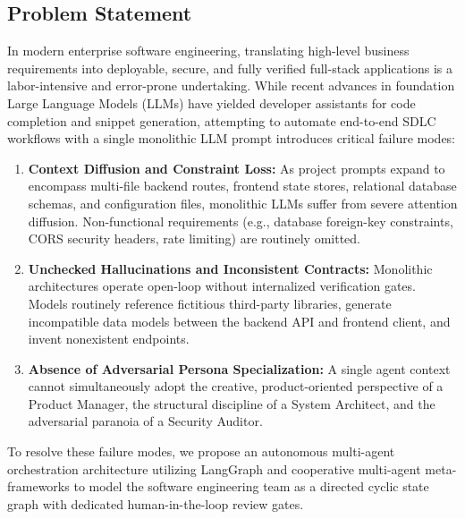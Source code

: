 \documentclass[10pt,journal,compsoc]{IEEEtran}
\begin{document}
\subsection{Problem Statement}
In modern enterprise software engineering, translating high-level business requirements into deployable, secure, and fully verified full-stack applications is a labor-intensive and error-prone undertaking. While recent advances in foundation Large Language Models (LLMs) have yielded developer assistants for code completion and snippet generation, attempting to automate end-to-end SDLC workflows with a single monolithic LLM prompt introduces critical failure modes:
\begin{enumerate}
    \item \textbf{Context Diffusion and Constraint Loss:} As project prompts expand to encompass multi-file backend routes, frontend state stores, relational database schemas, and configuration files, monolithic LLMs suffer from severe attention diffusion. Non-functional requirements (e.g., database foreign-key constraints, CORS security headers, rate limiting) are routinely omitted.
    \item \textbf{Unchecked Hallucinations and Inconsistent Contracts:} Monolithic architectures operate open-loop without internalized verification gates. Models routinely reference fictitious third-party libraries, generate incompatible data models between the backend API and frontend client, and invent nonexistent endpoints.
    \item \textbf{Absence of Adversarial Persona Specialization:} A single agent context cannot simultaneously adopt the creative, product-oriented perspective of a Product Manager, the structural discipline of a System Architect, and the adversarial paranoia of a Security Auditor.
\end{enumerate}

To resolve these failure modes, we propose an autonomous multi-agent orchestration architecture utilizing LangGraph \cite{langchain2024} and cooperative multi-agent meta-frameworks \cite{hong2023metagpt} to model the software engineering team as a directed cyclic state graph with dedicated human-in-the-loop review gates.
\end{document}
